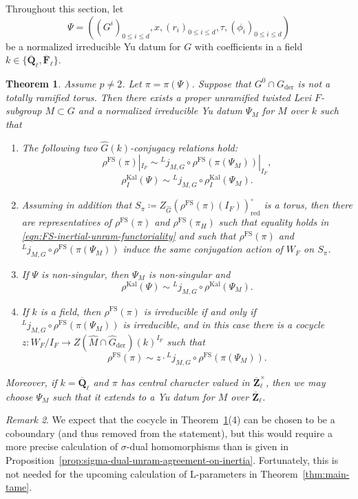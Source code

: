 \documentclass[reqno]{amsart}
\numberwithin{equation}{subsection}
\newcommand{\F}{\mathbf{F}}
\newcommand{\Q}{\mathbf{Q}}
\newcommand{\Z}{\mathbf{Z}}
\newcommand{\ol}[1]{\overline{#1}}
\newcommand{\wh}[1]{\widehat{#1}}
\newcommand{\co}{\colon}
\newcommand{\ld}{{}^L}
\DeclareMathOperator{\FS}{FS}
\DeclareMathOperator{\red}{red}
\DeclareMathOperator{\Kal}{Kal}
\DeclareMathOperator{\der}{der}
\newtheorem{thm}{Theorem}[subsection]
\theoremstyle{remark}
\newtheorem{remark}[thm]{Remark}
\numberwithin{equation}{subsection}
\numberwithin{figure}{subsection}
\begin{document}
Throughout this section, let
\[
\Psi = ((G^i)_{0\leq i\leq d}, x, (r_i)_{0\leq i\leq d}, \tau, (\phi_i)_{0\leq i\leq d})
\]
be a normalized irreducible Yu datum for $G$ with coefficients in a field $k \in \{\ol\Q_\ell, \ol\F_\ell\}$.

\begin{thm}\label{thm:unramified-twisted-Levi-functoriality}
Assume $p\neq 2$. Let $\pi = \pi(\Psi)$. Suppose that $G^0 \cap G_{\der}$ is not a totally ramified torus. Then there exists a proper unramified twisted Levi $F$-subgroup $M \subset G$ and a normalized irreducible Yu datum $\Psi_M$ for $M$ over $k$ such that
\begin{enumerate}
\item The following two $\wh G(k)$-conjugacy relations hold:
\begin{equation}\label{eqn:FS-inertial-unram-functoriality}
\rho^{\FS}(\pi)|_{I_F}
\sim
\ld j_{M,G}\circ \rho^{\FS}(\pi(\Psi_M))|_{I_F},
\end{equation}
\[
\rho_I^{\Kal}(\Psi)
\sim
\ld j_{M,G}\circ \rho_I^{\Kal}(\Psi_M).
\]
\item Assuming in addition that $S_\pi \coloneqq Z_{\wh G}(\rho^{\FS}(\pi)(I_F))^\circ_{\red}$ is a torus, then there are representatives of $\rho^{\FS}(\pi)$ and $\rho^{\FS}(\pi_H)$ such that equality holds in \eqref{eqn:FS-inertial-unram-functoriality} and such that $\rho^{\FS}(\pi)$ and $\ld j_{M,G}\circ \rho^{\FS}(\pi(\Psi_M))$ induce the same conjugation action of $W_F$ on $S_\pi$.
\item If $\Psi$ is non-singular, then $\Psi_M$ is non-singular and
\[
\rho^{\Kal}(\Psi) \sim \ld j_{M, G} \circ \rho^{\Kal}(\Psi_M).
\]
\item If $k$ is a field, then $\rho^{\FS}(\pi)$ is irreducible if and only if $\ld j_{M,G} \circ \rho^{\FS}(\pi(\Psi_M))$ is irreducible, and in this case there is a cocycle $z\co W_F/I_F \to Z(\wh M \cap \wh G_{\der})(k)^{I_F}$ such that 
\[
\rho^{\FS}(\pi) \sim z \cdot \ld j_{M,G} \circ \rho^{\FS}(\pi(\Psi_M)).
\]
\end{enumerate}
Moreover, if $k = \ol\Q_\ell$ and $\pi$ has central character valued in $\ol\Z_\ell^\times$, then we may choose $\Psi_M$ such that it extends to a Yu datum for $M$ over $\ol\Z_\ell$.
\end{thm}


\begin{remark}
We expect that the cocycle in Theorem~\ref{thm:unramified-twisted-Levi-functoriality}(4) can be chosen to be a coboundary (and thus removed from the statement), but this would require a more precise calculation of $\sigma$-dual homomorphisms than is given in Proposition~\ref{prop:sigma-dual-unram-agreement-on-inertia}. Fortunately, this is not needed for the upcoming calculation of L-parameters in Theorem~\ref{thm:main-tame}.
\end{remark}
\end{document}
